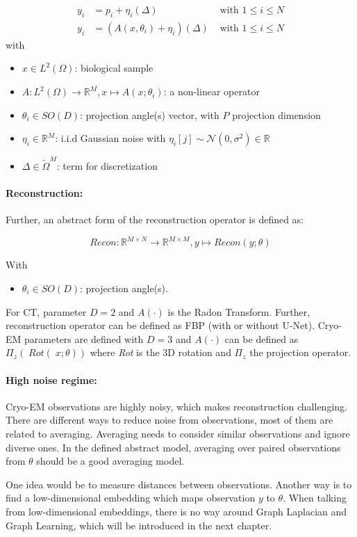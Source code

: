 \begin{equation}
    \label{eq:abstract-model}
    \begin{aligned}
        y_i &= p_i + \eta_i (\Delta) & \text{ with } 1 \leq i \leq N \\
        y_i &= \left( A(x, \theta_i) + \eta_i \right) (\Delta) & \text{ with } 1 \leq i \leq N 
    \end{aligned}
\end{equation}
with
\begin{itemize}
    \item $x \in L^2(\Omega)$: biological sample
    \item $A: L^2(\Omega) \to \mathbb{R}^M, x \mapsto A(x; \theta_i)$: a non-linear operator 
    \item $\theta_i \in SO(D)$: projection angle(s) vector, with $P$ projection dimension
    \item $\eta_i \in \mathbb{R}^M$: i.i.d Gaussian noise with $\eta_i[j] \sim \mathcal{N}(0,\sigma^2) \in \mathbb{R}$
    \item $\Delta \in \tilde{\Omega}^{M}$: term for discretization
\end{itemize}

\paragraph{Reconstruction:}

Further, an abstract form of the reconstruction operator is defined as:

\begin{equation}
    \textit{Recon} : \mathbb{R}^{M \times N} \to \mathbb{R}^{M \times M}, y \mapsto Recon(y; \theta)
\end{equation}

With
\begin{itemize}
    \item $\theta_i \in SO(D)$: projection angle(s).
\end{itemize}

For CT, parameter $D=2$ and $A(\cdot)$ is the Radon Transform.
Further, reconstruction operator can be defined as FBP (with or without U-Net).
Cryo-EM parameters are defined with $D=3$ and $A(\cdot)$ can be
defined as $\Pi_z \left(\; \textit{Rot}(\;x; \theta) \right)$ 
where \textit{Rot} is the 3D rotation and $\Pi_z$ the projection operator.


\paragraph{High noise regime:}
Cryo-EM observations are highly noisy, which makes reconstruction challenging. 
There are different ways to reduce noise from observations, most of them are related to averaging. 
Averaging needs to consider similar observations and ignore diverse ones. 
In the defined abstract model, averaging over paired observations from $\theta$ should be a good averaging model.

One idea would be to measure distances between observations.
Another way is to find a low-dimensional embedding which maps observation $y$ to $\theta$.
When talking from low-dimensional embeddings, there is no way around Graph Laplacian and Graph Learning,
which will be introduced in the next chapter.
